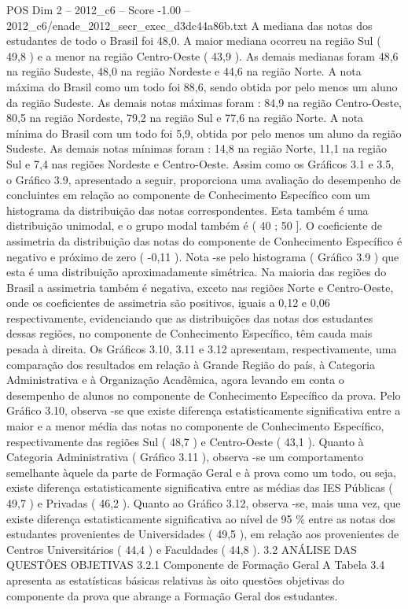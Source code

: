 \begin{textsample}{POS Dim 2 – 2012\_c6 – Score -1.00 – 2012\_c6/enade\_2012\_secr\_exec\_d3dc44a86b.txt}
A mediana das notas dos estudantes de todo o Brasil foi 48,0.
A maior mediana ocorreu na região Sul ( 49,8 ) e a menor na região Centro-Oeste ( 43,9 ).
As demais medianas foram 48,6 na região Sudeste, 48,0 na região Nordeste e 44,6 na região Norte.
A nota máxima do Brasil como um todo foi 88,6, sendo obtida por pelo menos um aluno da região Sudeste.
As demais notas máximas foram : 84,9 na região Centro-Oeste, 80,5 na região Nordeste, 79,2 na região Sul e 77,6 na região Norte.
A nota mínima do Brasil com um todo foi 5,9, obtida por pelo menos um aluno da região Sudeste.
As demais notas mínimas foram : 14,8 na região Norte, 11,1 na região Sul e 7,4 nas regiões Nordeste e Centro-Oeste.
Assim como os Gráficos 3.1 e 3.5, o Gráfico 3.9, apresentado a seguir, proporciona uma avaliação do desempenho de concluintes em relação ao componente de Conhecimento Específico com um histograma da distribuição das notas correspondentes.
Esta também é uma distribuição unimodal, e o grupo modal também é ( 40 ; 50 ].
O coeficiente de assimetria da distribuição das notas do componente de Conhecimento Específico é negativo e próximo de zero ( -0,11 ).
Nota -se pelo histograma ( Gráfico 3.9 ) que esta é uma distribuição aproximadamente simétrica.
Na maioria das regiões do Brasil a assimetria também é negativa, exceto nas regiões Norte e Centro-Oeste, onde os coeficientes de assimetria são positivos, iguais a 0,12 e 0,06 respectivamente, evidenciando que as distribuições das notas dos estudantes dessas regiões, no componente de Conhecimento Específico, têm cauda mais pesada à direita.
Os Gráficos 3.10, 3.11 e 3.12 apresentam, respectivamente, uma comparação dos resultados em relação à Grande Região do país, à Categoria Administrativa e à Organização Acadêmica, agora levando em conta o desempenho de alunos no componente de Conhecimento Específico da prova.
Pelo Gráfico 3.10, observa -se que existe diferença estatisticamente significativa entre a maior e a menor média das notas no componente de Conhecimento Específico, respectivamente das regiões Sul ( 48,7 ) e Centro-Oeste ( 43,1 ).
Quanto à Categoria Administrativa ( Gráfico 3.11 ), observa -se um comportamento semelhante àquele da parte de Formação Geral e à prova como um todo, ou seja, existe diferença estatisticamente significativa entre as médias das IES Públicas ( 49,7 ) e Privadas ( 46,2 ).
Quanto ao Gráfico 3.12, observa -se, mais uma vez, que existe diferença estatisticamente significativa ao nível de 95 \% entre as notas dos estudantes provenientes de Universidades ( 49,5 ), em relação aos provenientes de Centros Universitários ( 44,4 ) e Faculdades ( 44,8 ). 3.2 ANÁLISE DAS QUESTÕES OBJETIVAS 3.2.1 Componente de Formação Geral A Tabela 3.4 apresenta as estatísticas básicas relativas às oito questões objetivas do componente da prova que abrange a Formação Geral dos estudantes.

\end{textsample}
